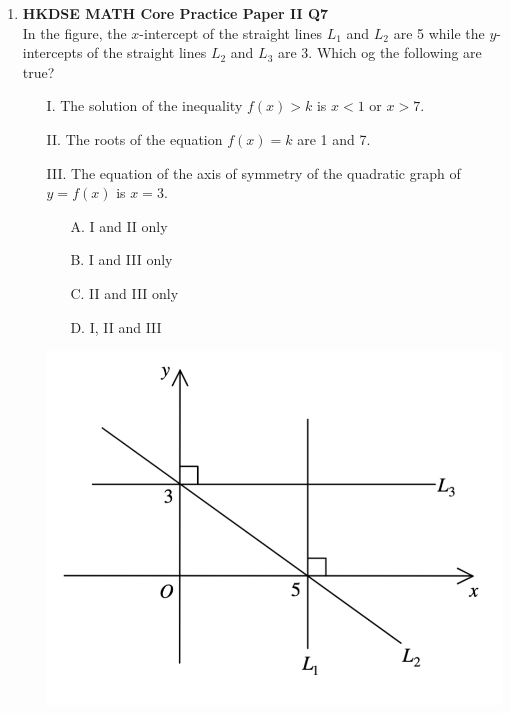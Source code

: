 \documentclass[12pt]{article}
\begin{document}
\begin{enumerate}
	\item \textbf{HKDSE MATH Core Practice Paper II Q7}\\
	In the figure, the $x$-intercept of the straight lines $L_1$ and $L_2$ are 5 while the $y$-intercepts of the straight lines $L_2$ and $L_3$ are 3. Which og the following are true?
	\begin{enumerate}
		\item[I.] The solution of the inequality $f(x) > k$ is $x < 1$ or $x > 7$.
		\item[II.] The roots of the equation $f(x) = k$ are 1 and 7.
		\item[III.] The equation of the axis of symmetry of the quadratic graph of $y = f(x)$ is $x = 3$.
		\item[]
			\begin{minipage}[u]{.39\textwidth}
				\begin{enumerate}
					\item[A.] I and II only
					\item[B.] I and III only
					\item[C.] II and III only
					\item[D.] I, II and III
				\end{enumerate}
			\end{minipage}
			\begin{minipage}[u]{.5\textwidth}
				\centering
				\includegraphics[scale=0.6]{PPFigure2.7.png}
			\end{minipage}
	\end{enumerate}


\end{enumerate}
\end{document}
